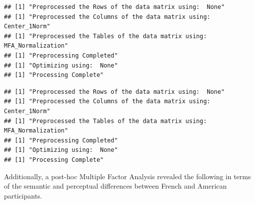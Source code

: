 \documentclass[
  english,
  man,floatsintext]{apa6}
\begin{document}
\begin{verbatim}
## [1] "Preprocessed the Rows of the data matrix using:  None"
## [1] "Preprocessed the Columns of the data matrix using:  Center_1Norm"
## [1] "Preprocessed the Tables of the data matrix using:  MFA_Normalization"
## [1] "Preprocessing Completed"
## [1] "Optimizing using:  None"
## [1] "Processing Complete"
\end{verbatim}

\begin{verbatim}
## [1] "Preprocessed the Rows of the data matrix using:  None"
## [1] "Preprocessed the Columns of the data matrix using:  Center_1Norm"
## [1] "Preprocessed the Tables of the data matrix using:  MFA_Normalization"
## [1] "Preprocessing Completed"
## [1] "Optimizing using:  None"
## [1] "Processing Complete"
\end{verbatim}

Additionally, a post-hoc Multiple Factor Analysis revealed the following in terms of the semantic and perceptual differences between French and American participants.
\end{document}

